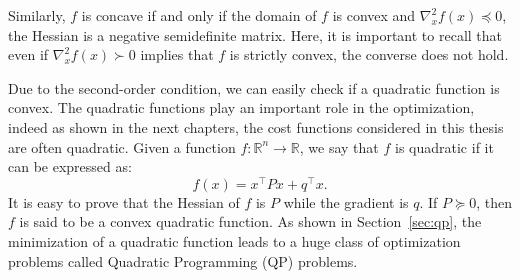 Similarly, $f$ is concave if and only if the domain of $f$ is convex and $\nabla^2_x f(x) \preceq 0$, the Hessian is a negative semidefinite matrix. Here, it is important to recall that even if $\nabla^2_x f(x) \succ 0$ implies that $f$ is strictly convex, the converse does not hold.
\par
Due to the second-order condition, we can easily check if a quadratic function is convex. The quadratic functions play an important role in the optimization, indeed as shown in the next chapters, the cost functions considered in this thesis are often quadratic. Given a function $f:\mathbb{R}^n \rightarrow \mathbb{R}$, we say that $f$ is quadratic if it can be expressed as:
\begin{equation}
    f(x) = x ^\top P x + q^\top x.
\end{equation}
It is easy to prove that the Hessian of $f$ is $P$ while the gradient is $q$. If $P \succeq 0$, then $f$ is said to be a convex quadratic function. As shown in Section~\ref{sec:qp}, the minimization of a quadratic function leads to a huge class of optimization problems called Quadratic Programming (QP) problems. 
